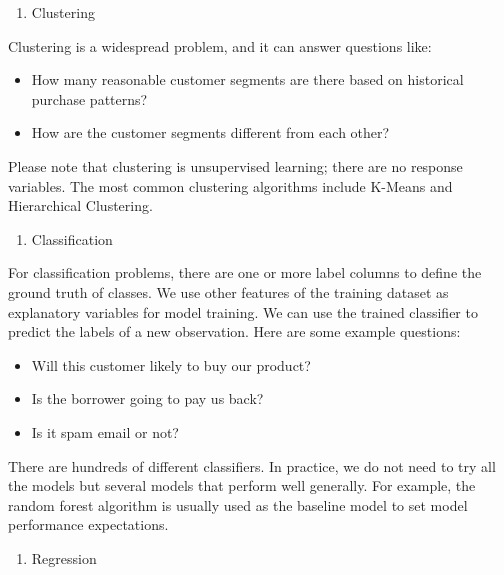 \documentclass[
  12pt,
]{krantz}
\providecommand{\tightlist}{%
  \setlength{\itemsep}{0pt}\setlength{\parskip}{0pt}}
\begin{document}
\begin{enumerate}
\def\labelenumi{\arabic{enumi}.}
\setcounter{enumi}{2}
\tightlist
\item
  Clustering
\end{enumerate}

Clustering is a widespread problem, and it can answer questions like:

\begin{itemize}
\tightlist
\item
  How many reasonable customer segments are there based on historical purchase patterns?
\item
  How are the customer segments different from each other?
\end{itemize}

Please note that clustering is unsupervised learning; there are no response variables. The most common clustering algorithms include K-Means and Hierarchical Clustering.

\begin{enumerate}
\def\labelenumi{\arabic{enumi}.}
\setcounter{enumi}{3}
\tightlist
\item
  Classification
\end{enumerate}

For classification problems, there are one or more label columns to define the ground truth of classes. We use other features of the training dataset as explanatory variables for model training. We can use the trained classifier to predict the labels of a new observation. Here are some example questions:

\begin{itemize}
\tightlist
\item
  Will this customer likely to buy our product?
\item
  Is the borrower going to pay us back?
\item
  Is it spam email or not?
\end{itemize}

There are hundreds of different classifiers. In practice, we do not need to try all the models but several models that perform well generally. For example, the random forest algorithm is usually used as the baseline model to set model performance expectations.

\begin{enumerate}
\def\labelenumi{\arabic{enumi}.}
\setcounter{enumi}{4}
\tightlist
\item
  Regression
\end{enumerate}
\end{document}
